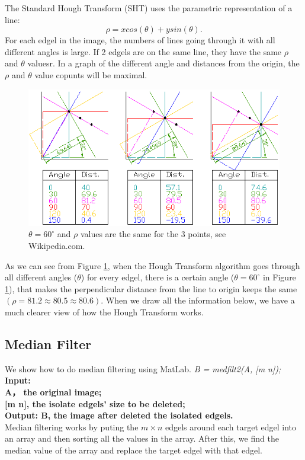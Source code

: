 The Standard Hough Transform (SHT) uses the parametric representation of a line: 
\begin{equation}
\rho = x cos(\theta) + y sin(\theta).
\label{eqn_parametric}
\end{equation} 
For each edgel in the image, the numbers of lines going through it 
with all different angles is large. If 2 edgels are on the same line, 
they have the same $\rho$ and $\theta$ valuesr. In a graph of the
different angle and distances from the origin, the $\rho$ and $\theta$
value copunts will be maximal.
\begin{figure}[ht]
    \includegraphics[scale=0.7]{pic/SHT-example2.png}
    \caption{$\theta=60^{\circ}$ and $\rho$ values are the same for the 3 points,
    see Wikipedia.com.}
\label{fig_SHT}
\end{figure}
As we can see from Figure \ref{fig_SHT}, when the Hough Transform algorithm 
goes through all different angles ($\theta$) for every edgel, there is a 
certain angle ($\theta=60^{\circ}$ in Figure \ref{fig_SHT}), that makes the 
perpendicular distance from the line to origin keeps the same 
$(\rho = 81.2 \approx 80.5 \approx 80.6)$. When we draw all the information 
below, we have a much clearer view of how the Hough Transform works.

\subsection{Median Filter}
We show how to do median filtering using MatLab.
\vspace{3mm}
\textit{B = medfilt2(A, [m n]);}\\
\newline
\textbf{Input:\\ A， the original image;}\\
\textbf{[m n], the isolate edgels’ size to be deleted;}\\ 
\textbf{Output: B, the image after deleted the isolated edgels.}\\
\newline
Median filtering works by puting the $m \times n$ edgels around each 
target edgel into an array and then sorting all the values in the array.
After this, we find the median value of the array and replace the target edgel
with that edgel.

